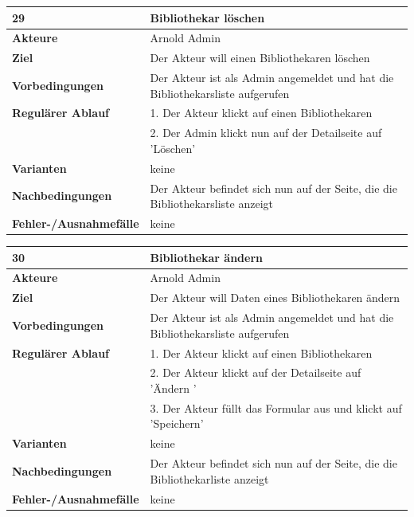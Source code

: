 \documentclass[fontsize=12pt,paper=a4,twoside]{scrartcl}
\begin{document}
\begin{table}[htbp]
\label{29}
\begin{tabular}{|l|p{10cm}|}
\hline 
\textbf{29} & \textbf{Bibliothekar löschen} \\ \hline
\textbf{Akteure} & Arnold Admin\\ \hline
\textbf{Ziel} & Der Akteur will einen Bibliothekaren löschen \\ \hline
\textbf{Vorbedingungen} & Der Akteur ist als Admin angemeldet und hat die Bibliothekarsliste 
aufgerufen\\\hline
\textbf{Regulärer Ablauf} & 
1. Der Akteur klickt auf einen Bibliothekaren \\
&2. Der Admin klickt nun auf der Detailseite auf 'Löschen'\\
\hline
\textbf{Varianten} & 
keine \\ \hline
\textbf{Nachbedingungen} & Der Akteur befindet sich nun auf der Seite, die die Bibliothekarsliste 
anzeigt\\ \hline
\textbf{Fehler-/Ausnahmefälle} & keine\\
\hline
\end{tabular}
\end{table}

\begin{table}[htbp]
\label{30}
\begin{tabular}{|l|p{10cm}|}
\hline 
\textbf{30} & \textbf{Bibliothekar ändern} \\ \hline
\textbf{Akteure} & Arnold Admin\\ \hline
\textbf{Ziel} & Der Akteur will Daten eines Bibliothekaren ändern \\ \hline
\textbf{Vorbedingungen} & Der Akteur ist als Admin angemeldet und hat die Bibliothekarsliste 
aufgerufen \\ \hline
\textbf{Regulärer Ablauf} & 
1. Der Akteur klickt auf einen Bibliothekaren \\
&2. Der Akteur klickt auf der Detailseite auf 'Ändern '\\
&3. Der Akteur füllt das Formular aus und klickt auf 'Speichern'\\
\hline
\textbf{Varianten} & 
keine \\ \hline
\textbf{Nachbedingungen} & Der Akteur befindet sich nun auf der Seite, die die Bibliothekarliste 
anzeigt\\ \hline
\textbf{Fehler-/Ausnahmefälle} & keine\\
\hline
\end{tabular}
\end{table}
\end{document}
